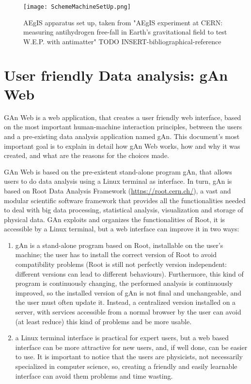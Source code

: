 \begin{figure}[H]
\centering
\texttt{[image: SchemeMachineSetUp.png]} 
\caption{AEgIS apparatus set up, taken from "AEgIS experiment at CERN: measuring antihydrogen free-fall in Earth’s gravitational field to test W.E.P. with antimatter" TODO INSERT-bibliographical-reference}
\end{figure}

\section{User friendly Data analysis: gAn Web}

GAn Web is a web application, that creates a user friendly web interface, based on the most important human-machine interaction principles, between the users and a pre-existing data analysis application named gAn.
This document's most important goal is to explain in detail how gAn Web works, how and why it was created, and what are the reasons for the choices made. 

GAn Web is based on the pre-existent stand-alone program gAn, that allows users to do data analysis using a Linux terminal as interface. In turn, gAn is based on Root Data Analysis Framework (\url{https://root.cern.ch/}), a vast and modular scientific software framework that provides all the functionalities needed to deal with big data processing, statistical analysis, visualization and storage of physical data. GAn exploits and organizes the functionalities of Root, it is accessible by a Linux terminal, but a web interface can improve it in two ways:

\begin{enumerate}

\item gAn is a stand-alone program based on Root, installable on the user's machine; the user has to install the correct version of Root to avoid compatibility problems (Root is still not perfectly version independent: different versions can lead to different behaviours). Furthermore, this kind of program is continuously changing, the performed analysis is continuously improved, so the installed version of gAn is not final and unchangeable, and the user must often update it. Instead, a centralized version installed on a server, with services accessible from a normal browser by the user can avoid (at least reduce) this kind of problems and be more usable.    
 

\item a Linux terminal interface is practical for expert users, but a web based interface can be more attractive for new users, and, if well done, can be easier to use. It is important to notice that the users are physicists, not necessarily specialized in computer science, so, creating a friendly and easily learnable interface can avoid them problems and time wasting.   


\end{enumerate}


